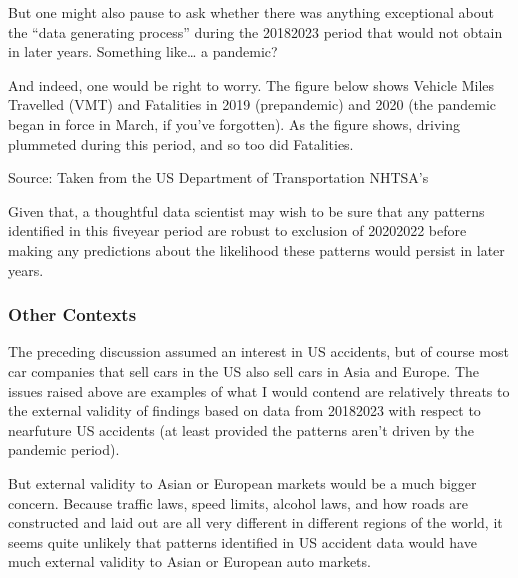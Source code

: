 \documentclass[letterpaper,10pt,english]{jupyterBook}
\begin{document}
\sphinxAtStartPar
But one might also pause to ask whether there was anything exceptional about the “data generating process” during the 2018\sphinxhyphen{}2023 period that would not obtain in later years. Something like… a pandemic?

\sphinxAtStartPar
And indeed, one would be right to worry. The figure below shows Vehicle Miles Travelled (VMT) and Fatalities in 2019 (pre\sphinxhyphen{}pandemic) and 2020 (the pandemic began in force in March, if you’ve forgotten). As the figure shows, driving plummeted during this period, and so too did Fatalities.

\sphinxAtStartPar
{}

\sphinxAtStartPar
Source: Taken from the US Department of Transportation NHTSA’s 

\sphinxAtStartPar
Given that, a thoughtful data scientist may wish to be sure that any patterns identified in this five\sphinxhyphen{}year period are robust to exclusion of 2020\sphinxhyphen{}2022 before making any predictions about the likelihood these patterns would persist in later years.


\subsubsection{Other Contexts}
\label{\detokenize{30_questions/15_answering_exploratory_questions:other-contexts}}
\sphinxAtStartPar
The preceding discussion assumed an interest in US accidents, but of course most car companies that sell cars in the US also sell cars in Asia and Europe. The issues raised above are examples of what I would contend are relatively  threats to the external validity of findings based on data from 2018\sphinxhyphen{}2023 with respect to near\sphinxhyphen{}future US accidents (at least provided the patterns aren’t driven by the pandemic period).

\sphinxAtStartPar
But external validity to Asian or European markets would be a much bigger concern. Because traffic laws, speed limits, alcohol laws, and how roads are constructed and laid out are all very different in different regions of the world, it seems quite unlikely that patterns identified in US accident data would have much external validity to Asian or European auto markets.
\end{document}
